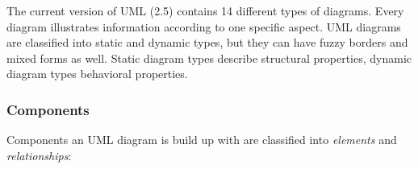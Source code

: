 \documentclass[twoside, openright, 12pt]{book}
\begin{document}
The current version of UML (2.5) contains 14 different types of diagrams.
Every diagram illustrates information according to one specific aspect.
UML diagrams are classified into static and dynamic types, but they can have fuzzy borders and mixed forms as well.
Static diagram types describe structural properties, dynamic diagram types behavioral properties.



\subsubsection{Components}
Components an UML diagram is build up with are classified into \textit{elements} and \textit{relationships}:
\end{document}
